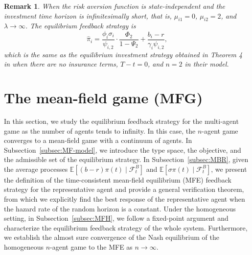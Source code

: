 \documentclass[11pt]{article}
\newtheorem{remark}{Remark}[section]
\numberwithin{equation}{section}
\begin{document}
	
	\begin{remark}
		When the risk aversion function is state-independent and the investment time horizon is infinitesimally short, that is, \(\mu_{i1}=0\), \(\mu_{i2}=2\), and \(\lambda\to \infty\). The equilibrium  feedback  strategy is
		\[
		\widehat{\pi}_i=\frac{\phi_i\sigma_i}{\psi_{i,2}} \cdot
		\frac{\Phi_2}{1 -\Psi_2}+\frac{b_i-r}{\gamma_i\psi_{i,2}},
		\]
		which is the same as the equilibrium investment strategy obtained in Theorem 4 in \citet{guan2022time} when there are no insurance terms, \(T-t=0\), and \(n=2\) in their model.
	\end{remark}
	
	
	
	\section{The mean-field game (MFG)}\label{sec:MF}
	In this section, we study the equilibrium feedback strategy for the multi-agent game as the number of agents tends to infinity. In this case,  the \(n\)-agent game converges to a mean-field game with a continuum of agents. In Subsection~\ref{subsec:MF-model}, we introduce the type space, the objective, and the admissible set of the equilibrium strategy. In Subsection~\ref{subsec:MBR}, given the average processes $\mathbb{E}[(b-r)\pi(t)\mid\mathcal{F}_t^B]$ and $\mathbb{E}[\sigma\pi(t)\mid\mathcal{F}_t^B]$, we present the definition of the time-consistent mean-field equilibrium (MFE) feedback strategy for the representative agent and provide a general verification theorem, from which we explicitly find the best response of the representative agent when the hazard rate of the random horizon is a constant. Under the homogeneous setting, in Subsection~\ref{subsec:MFH}, we follow a fixed-point argument and characterize the equilibrium feedback strategy of the whole system. Furthermore, we establish the almost sure convergence of the Nash equilibrium of the homogeneous $n$-agent game to the MFE as $n\to\infty$.
	
	
	
\end{document}
